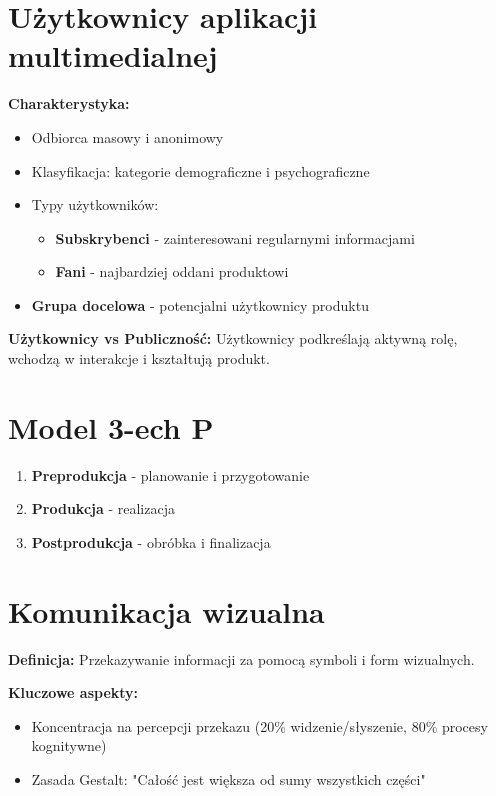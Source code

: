 \section{Użytkownicy aplikacji multimedialnej}
\textbf{Charakterystyka:}
\begin{itemize}[noitemsep]
    \item Odbiorca masowy i anonimowy
    \item Klasyfikacja: kategorie demograficzne i psychograficzne
    \item Typy użytkowników:
    \begin{itemize}[noitemsep]
        \item \textbf{Subskrybenci} - zainteresowani regularnymi informacjami
        \item \textbf{Fani} - najbardziej oddani produktowi
    \end{itemize}
    \item \textbf{Grupa docelowa} - potencjalni użytkownicy produktu
\end{itemize}

\textbf{Użytkownicy vs Publiczność:} Użytkownicy podkreślają aktywną rolę, wchodzą w interakcje i kształtują produkt.

\section{Model 3-ech P}
\begin{enumerate}[noitemsep]
    \item \textbf{Preprodukcja} - planowanie i przygotowanie
    \item \textbf{Produkcja} - realizacja
    \item \textbf{Postprodukcja} - obróbka i finalizacja
\end{enumerate}

\section{Komunikacja wizualna}
\textbf{Definicja:} Przekazywanie informacji za pomocą symboli i form wizualnych.

\textbf{Kluczowe aspekty:}
\begin{itemize}[noitemsep]
    \item Koncentracja na percepcji przekazu (20\% widzenie/słyszenie, 80\% procesy kognitywne)
    \item Zasada Gestalt: "Całość jest większa od sumy wszystkich części"
\end{itemize}

